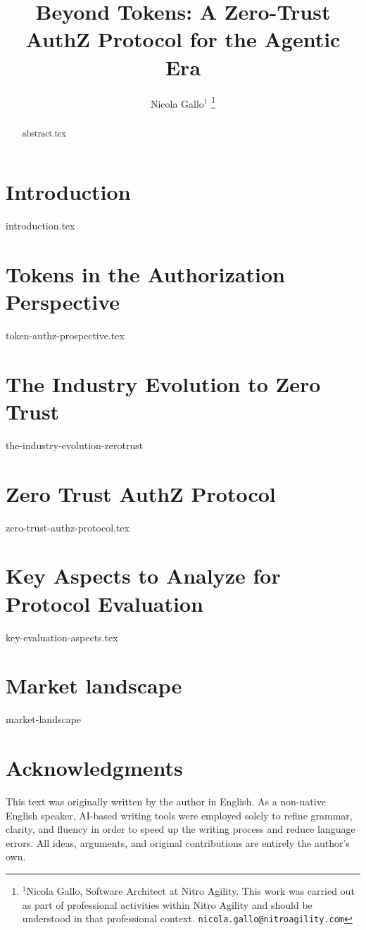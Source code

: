 \documentclass[letterpaper, 10 pt, conference]{ieeeconf}  %
\title{\LARGE \bf
Beyond Tokens: A Zero-Trust AuthZ Protocol for the Agentic Era
}
\author{Nicola Gallo$^{1}$%
\thanks{$^{1}$Nicola Gallo, Software Architect at Nitro Agility. 
This work was carried out as part of professional activities within Nitro Agility and should be understood in that professional context. 
{\tt\small nicola.gallo@nitroagility.com}}%
}
\begin{document}
\maketitle
\thispagestyle{empty}
\pagestyle{empty}

\begin{abstract}
{abstract.tex}
\end{abstract}

\section{Introduction}
\label{sec:introduction}
{introduction.tex}

\section{Tokens in the Authorization Perspective}
\label{sec:token-authz-prospective}
{token-authz-prospective.tex}

\section{The Industry Evolution to Zero Trust}
\label{sec:the-industry-evolution-zerotrust}
{the-industry-evolution-zerotrust}

\section{Zero Trust AuthZ Protocol}
\label{sec:zero-trust-authz-protocol}
{zero-trust-authz-protocol.tex}

\section{Key Aspects to Analyze for Protocol Evaluation}
\label{sec:key-evaluation-aspects.tex}
{key-evaluation-aspects.tex}

\section{Market landscape}
\label{sec:market-landscape}
{market-landscape}

\section*{Acknowledgments}
This text was originally written by the author in English. 
As a non-native English speaker, AI-based writing tools were employed solely to refine grammar, clarity, and fluency in order to speed up the writing process and reduce language errors.
All ideas, arguments, and original contributions are entirely the author's own.
\end{document}
